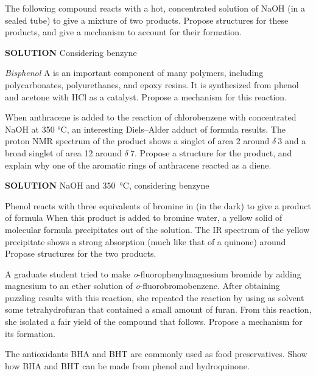 \begin{example}
    The following compound reacts with a hot, concentrated solution of NaOH (in a sealed tube) to give a mixture of two products. Propose structures for these products, and give a mechanism to account for their formation.

    \noindent \textbf{SOLUTION} \quad Considering benzyne
\end{example}

\begin{example} %
    \textit{Bisphenol} A is an important component of many polymers, including polycarbonates, polyurethanes, and epoxy resins. It is synthesized from phenol and acetone with HCl as a catalyst. Propose a mechanism for this reaction.
\end{example}

\begin{example} %
    When anthracene is added to the reaction of chlorobenzene with concentrated NaOH at 350 °C, an interesting Diels–Alder adduct of formula  results. The proton NMR spectrum of the product shows a singlet of area 2 around $ \delta \ 3 $ and a broad singlet of area 12 around $ \delta \ 7 $. Propose a structure for the product, and explain why one of the aromatic rings of anthracene reacted as a diene.

    \noindent \textbf{SOLUTION} \quad NaOH and \qty{350}{\degreeCelsius}, considering benzyne
\end{example}

\begin{example} %
    Phenol reacts with three equivalents of bromine in (in the dark) to give a product of formula When this product is added to bromine water, a yellow solid of molecular formula precipitates out of the solution. The IR spectrum of the yellow precipitate shows a strong absorption (much like that of a quinone) around Propose structures for the two products.
\end{example}

\begin{example} %
    A graduate student tried to make \textit{o}-fluorophenylmagnesium bromide by adding magnesium to an ether solution of \textit{o}-fluorobromobenzene. After obtaining puzzling results with this reaction, she repeated the reaction by using as solvent some tetrahydrofuran that contained a small amount of furan. From this reaction, she isolated a fair yield of the compound that follows. Propose a mechanism for its formation.
\end{example}

\begin{example} %
    The antioxidants BHA and BHT are commonly used as food preservatives. Show how BHA and BHT can be made from phenol and hydroquinone.
\end{example}